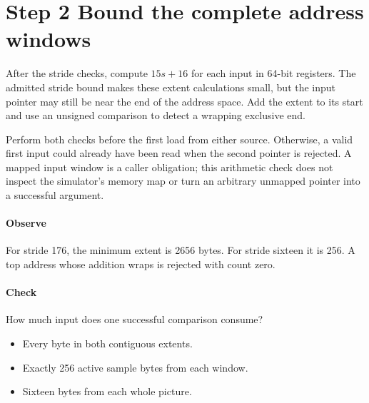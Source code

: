 \section{Step 2 Bound the complete address windows}\label{h263-sad-s02}
After the stride checks, compute $15s+16$ for each input in 64-bit registers.
The admitted stride bound makes these extent calculations small, but the input
pointer may still be near the end of the address space. Add the extent to its
start and use an unsigned comparison to detect a wrapping exclusive end.

Perform both checks before the first load from either source. Otherwise, a valid
first input could already have been read when the second pointer is rejected.
A mapped input window is a caller obligation; this arithmetic check does not
inspect the simulator's memory map or turn an arbitrary unmapped pointer into a
successful argument.

\paragraph{Observe} For stride 176, the minimum extent is 2656 bytes. For stride
sixteen it is 256. A top address whose addition wraps is rejected with count zero.
\paragraph{Check} How much input does one successful comparison consume?
\begin{itemize}
  \item[A.] Every byte in both contiguous extents.
  \item[B.] Exactly 256 active sample bytes from each window.
  \item[C.] Sixteen bytes from each whole picture.
\end{itemize}
